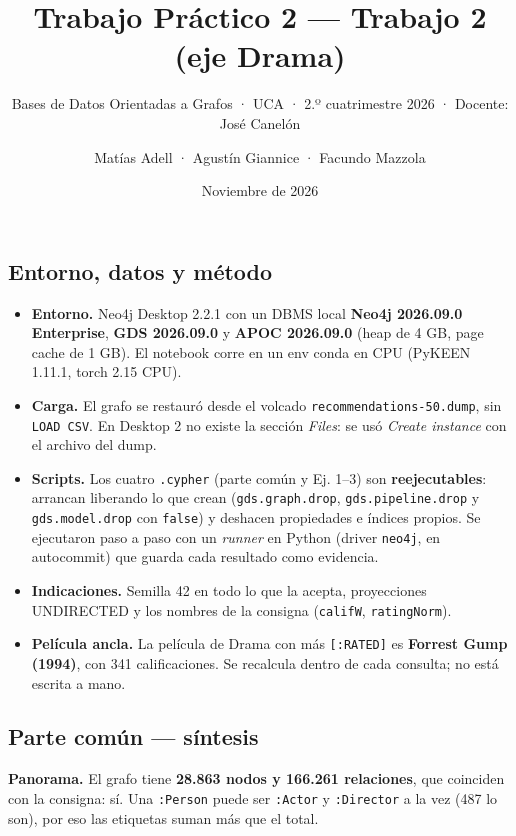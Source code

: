 \documentclass[
  spanish,
  10pt,
]{article}
\title{Trabajo Práctico 2 --- Trabajo 2 (eje Drama)}
\subtitle{Bases de Datos Orientadas a Grafos · UCA · 2.º cuatrimestre
2026 · Docente: José Canelón}
\author{Matías Adell · Agustín Giannice · Facundo Mazzola}
\date{Noviembre de 2026}
\providecommand{\tightlist}{%
  \setlength{\itemsep}{0pt}\setlength{\parskip}{0pt}}
\begin{document}
\maketitle

\subsection{Entorno, datos y método}\label{entorno-datos-y-muxe9todo}

\begin{itemize}
\tightlist
\item
  \textbf{Entorno.} Neo4j Desktop 2.2.1 con un DBMS local \textbf{Neo4j
  2026.09.0 Enterprise}, \textbf{GDS 2026.09.0} y \textbf{APOC
  2026.09.0} (heap de 4 GB, page cache de 1 GB). El notebook corre en un
  env conda en CPU (PyKEEN 1.11.1, torch 2.15 CPU).
\item
  \textbf{Carga.} El grafo se restauró desde el volcado
  \texttt{recommendations-50.dump}, sin \texttt{LOAD\ CSV}. En Desktop 2
  no existe la sección \emph{Files}: se usó \emph{Create instance} con
  el archivo del dump.
\item
  \textbf{Scripts.} Los cuatro \texttt{.cypher} (parte común y Ej. 1--3)
  son \textbf{reejecutables}: arrancan liberando lo que crean
  (\texttt{gds.graph.drop}, \texttt{gds.pipeline.drop} y
  \texttt{gds.model.drop} con \texttt{false}) y deshacen propiedades e
  índices propios. Se ejecutaron paso a paso con un \emph{runner} en
  Python (driver \texttt{neo4j}, en autocommit) que guarda cada
  resultado como evidencia.
\item
  \textbf{Indicaciones.} Semilla 42 en todo lo que la acepta,
  proyecciones UNDIRECTED y los nombres de la consigna (\texttt{califW},
  \texttt{ratingNorm}).
\item
  \textbf{Película ancla.} La película de Drama con más
  \texttt{{[}:RATED{]}} es \textbf{Forrest Gump (1994)}, con 341
  calificaciones. Se recalcula dentro de cada consulta; no está escrita
  a mano.
\end{itemize}

\subsection{Parte común --- síntesis}\label{parte-comuxfan-suxedntesis}

\textbf{Panorama.} El grafo tiene \textbf{28.863 nodos y 166.261
relaciones}, que coinciden con la consigna: sí. Una \texttt{:Person}
puede ser \texttt{:Actor} y \texttt{:Director} a la vez (487 lo son),
por eso las etiquetas suman más que el total.
\end{document}
